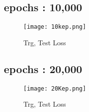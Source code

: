 \documentclass[conference]{IEEEtran}
\begin{document}
\subsection{epochs : 10,000}
\begin{figure}[H]
    \centering
    \texttt{[image: 10kep.png]}
    \caption{Trg, Test Loss}
    \label{fig:epoch10000}
\end{figure}
\subsection{epochs : 20,000}
\begin{figure}[H]
    \centering
    \texttt{[image: 20Kep.png]}
    \caption{Trg, Test Loss}
    \label{fig:epoch20000}
\end{figure}
\end{document}

